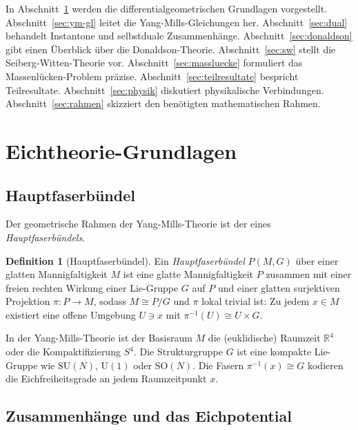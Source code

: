 \documentclass[12pt,a4paper]{amsart}
\theoremstyle{definition}
\newtheorem{definition}[theorem]{Definition}
\theoremstyle{remark}
\begin{document}
In Abschnitt~\ref{sec:eich} werden die differentialgeometrischen Grundlagen vorgestellt.
Abschnitt~\ref{sec:ym-gl} leitet die Yang-Mills-Gleichungen her.
Abschnitt~\ref{sec:dual} behandelt Instantone und selbstduale Zusammenhänge.
Abschnitt~\ref{sec:donaldson} gibt einen Überblick über die Donaldson-Theorie.
Abschnitt~\ref{sec:sw} stellt die Seiberg-Witten-Theorie vor.
Abschnitt~\ref{sec:massluecke} formuliert das Massenlücken-Problem präzise.
Abschnitt~\ref{sec:teilresultate} bespricht Teilresultate.
Abschnitt~\ref{sec:physik} diskutiert physikalische Verbindungen.
Abschnitt~\ref{sec:rahmen} skizziert den benötigten mathematischen Rahmen.

\section{Eichtheorie-Grundlagen}
\label{sec:eich}

\subsection{Hauptfaserbündel}

Der geometrische Rahmen der Yang-Mills-Theorie ist der eines \emph{Hauptfaserbündels}.

\begin{definition}[Hauptfaserbündel]
Ein \emph{Hauptfaserbündel} $P(M, G)$ über einer glatten Mannigfaltigkeit $M$ ist
eine glatte Mannigfaltigkeit $P$ zusammen mit einer freien rechten Wirkung einer
Lie-Gruppe $G$ auf $P$ und einer glatten surjektiven Projektion $\pi: P \to M$,
sodass $M \cong P/G$ und $\pi$ lokal trivial ist: Zu jedem $x \in M$ existiert eine
offene Umgebung $U \ni x$ mit $\pi^{-1}(U) \cong U \times G$.
\end{definition}

In der Yang-Mills-Theorie ist der Basisraum $M$ die (euklidische) Raumzeit $\mathbb{R}^4$
oder die Kompaktifizierung $S^4$. Die Strukturgruppe $G$ ist eine kompakte Lie-Gruppe
wie $\mathrm{SU}(N)$, $\mathrm{U}(1)$ oder $\mathrm{SO}(N)$. Die Fasern
$\pi^{-1}(x) \cong G$ kodieren die Eichfreiheitsgrade an jedem Raumzeitpunkt $x$.

\subsection{Zusammenhänge und das Eichpotential}
\end{document}
